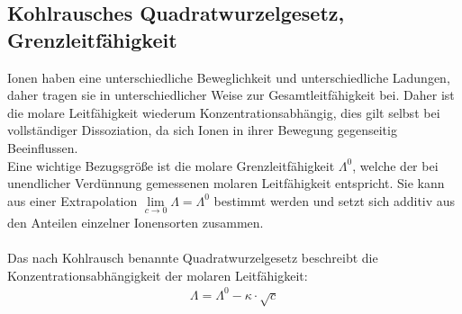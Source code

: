 \documentclass[12pt,a4paper,titlepage,headinclude,bibtotoc]{scrartcl}
\begin{document}
\subsection{Kohlrausches Quadratwurzelgesetz, Grenzleitfähigkeit}
Ionen haben eine unterschiedliche Beweglichkeit und unterschiedliche Ladungen, daher tragen sie in unterschiedlicher Weise zur Gesamtleitfähigkeit bei. Daher ist die molare Leitfähigkeit wiederum Konzentrationsabhängig, dies gilt selbst bei vollständiger Dissoziation, da sich Ionen in ihrer Bewegung gegenseitig Beeinflussen.\\
Eine wichtige Bezugsgröße ist die molare Grenzleitfähigkeit $\mathit{\Lambda^0}$, welche der bei unendlicher Verdünnung gemessenen molaren Leitfähigkeit entspricht. Sie kann aus einer Extrapolation $ \lim \limits_{c \rightarrow 0 } \mathit{\Lambda} = \mathit{\Lambda ^0}$ bestimmt werden und setzt sich additiv aus den Anteilen einzelner Ionensorten zusammen.\\\\
Das nach Kohlrausch benannte Quadratwurzelgesetz beschreibt die Konzentrationsabhängigkeit der molaren Leitfähigkeit:
\begin{align}
\mathit{\Lambda} = \mathit{\Lambda ^0} - \kappa \cdot \sqrt{c}
\end{align}
\end{document}
